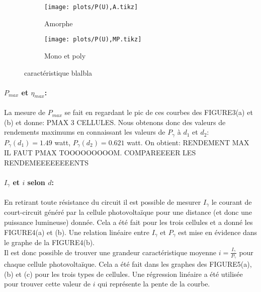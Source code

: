 \begin{figure}
    \centering
    \begin{subfigure}[c]{0.4\linewidth}
        \centering
        \texttt{[image: plots/P(U),A.tikz]}
        \caption{Amorphe}
        \label{plot:3a}        
    \end{subfigure}
    \begin{subfigure}[c]{0.4\linewidth}
        \centering
        \texttt{[image: plots/P(U),MP.tikz]}
        \caption{Mono et poly}
        \label{plot:3b}        
    \end{subfigure}
    \caption{caractéristique blalbla}
    \label{plot:3}
\end{figure}

\paragraph*{\(P_{max}\) et \(\eta_{max}\):}
La mesure de \(P_{max}\) se fait en regardant le pic de ces courbes des FIGURE3(a) et (b) et donne: PMAX 3 CELLULES. 
Nous obtenons donc des valeurs de rendements maximums en connaissant les valeurs de \(P_\gamma\) à \(d_1\) et \(d_2\): \(P_\gamma (d_1) = 1.49\) \unit{watt}, \(P_\gamma (d_2) = 0.621\) \unit{watt}. On obtient: RENDEMENT MAX IL FAUT PMAX TOOOOOOOOOM.
COMPAREEEER LES RENDEMEEEEEEEENTS

\paragraph*{\(I_\gamma\) et \(i\) selon \(d\):}
En retirant toute résistance du circuit il est possible de mesurer \(I_\gamma\) le courant de court-circuit généré par la cellule photovoltaïque pour une distance (et donc une puissance lumineuse) donnée. Cela a été fait pour les trois cellules et a donné les FIGURE4(a) et (b). Une relation linéaire entre \(I_\gamma\) et \(P_\gamma\) est mise en évidence dans le graphe de la FIGURE4(b). \\
Il est donc possible de trouver une grandeur caractéristique moyenne \(i = \frac{I_\gamma}{P_\gamma}\) pour chaque cellule photovoltaïque. Cela a été fait dans les graphes des FIGURE5(a), (b) et (c) pour les trois types de cellules. Une régression linéaire a été utilisée pour trouver cette valeur de \(i\) qui représente la pente de la courbe.

